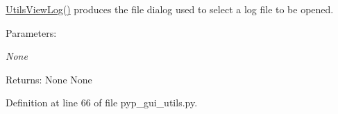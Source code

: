 \hyperlink{namespacePyPedal_1_1pyp__gui__utils_4506364150a4d59d9fd5154c1e40a029}{Utils\-View\-Log()} produces the file dialog used to select a log file to be opened. 

\begin{Desc}
\item[Parameters:]
\begin{description}
\item[{\em None}]\end{description}
\end{Desc}
\begin{Desc}
\item[Returns:]None  None \end{Desc}


Definition at line 66 of file pyp\_\-gui\_\-utils.py.